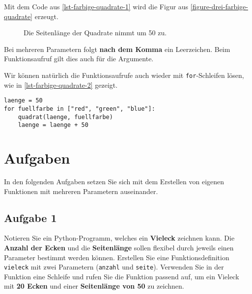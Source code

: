 Mit dem Code aus \autoref{lst-farbige-quadrate-1} wird die Figur aus \autoref{figure-drei-farbige-quadrate} erzeugt.

\begin{figure}[htb]
\centering
{}
\caption{Die Seitenlänge der Quadrate nimmt um 50 zu.}
\label{figure-drei-farbige-quadrate}
\end{figure}

\begin{cleancode}[Leerzeichen 5]
Bei mehreren Parametern folgt \textbf{nach dem Komma} ein Leerzeichen. Beim Funktionsaufruf gilt dies auch für die Argumente.
\end{cleancode}

Wir können natürlich die Funktionsaufrufe auch wieder mit \lstinline{for}-Schleifen lösen, wie in \autoref{lst-farbige-quadrate-2} gezeigt.

\begin{lstlisting}[caption={Eine Schleife mit einer Variablen organisiert die Funktionsaufrufe.}, label={lst-farbige-quadrate-2}]
laenge = 50
for fuellfarbe in ["red", "green", "blue"]:
    quadrat(laenge, fuellfarbe)
    laenge = laenge + 50
\end{lstlisting}

\newpage

\section{Aufgaben}

In den folgenden Aufgaben setzen Sie sich mit dem Erstellen von eigenen Funktionen mit mehreren Parametern auseinander.

\subsection{Aufgabe 1}

Notieren Sie ein Python-Programm, welches ein \textbf{Vieleck} zeichnen kann. Die \textbf{Anzahl der Ecken} und die \textbf{Seitenlänge} sollen flexibel durch jeweils einen Parameter bestimmt werden können. Erstellen Sie eine Funktionsdefinition \lstinline{vieleck} mit zwei Parametern (\lstinline{anzahl} und \lstinline{seite}). Verwenden Sie in der Funktion eine Schleife und rufen Sie die Funktion passend auf, um ein Vieleck mit \textbf{20 Ecken} und einer \textbf{Seitenlänge von 50} zu zeichnen.


